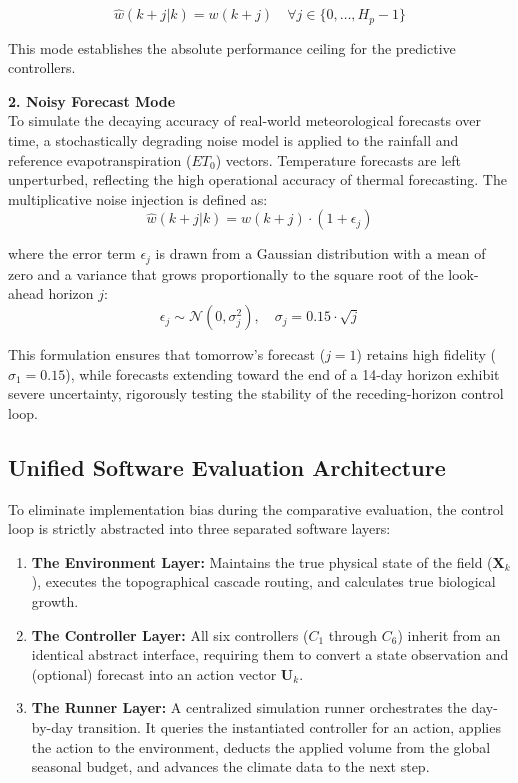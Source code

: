 \documentclass[11pt, a4paper]{article}
\begin{document}
\begin{equation}
    \hat{w}(k+j|k) = w(k+j) \quad \forall j \in \{0, \dots, H_p-1\}
\end{equation}

This mode establishes the absolute performance ceiling for the predictive controllers.

\textbf{2. Noisy Forecast Mode} \\
To simulate the decaying accuracy of real-world meteorological forecasts over time, a stochastically degrading noise model is applied to the rainfall and reference evapotranspiration ($ET_0$) vectors. Temperature forecasts are left unperturbed, reflecting the high operational accuracy of thermal forecasting. The multiplicative noise injection is defined as:
\begin{equation}
    \hat{w}(k+j|k) = w(k+j) \cdot (1 + \epsilon_j)
\end{equation}

where the error term $\epsilon_j$ is drawn from a Gaussian distribution with a mean of zero and a variance that grows proportionally to the square root of the look-ahead horizon $j$:
\begin{equation}
    \epsilon_j \sim \mathcal{N}(0, \sigma_j^2), \quad \sigma_j = 0.15 \cdot \sqrt{j}
\end{equation}

This formulation ensures that tomorrow's forecast ($j=1$) retains high fidelity ($\sigma_1 = 0.15$), while forecasts extending toward the end of a 14-day horizon exhibit severe uncertainty, rigorously testing the stability of the receding-horizon control loop.

\subsection{Unified Software Evaluation Architecture}
To eliminate implementation bias during the comparative evaluation, the control loop is strictly abstracted into three separated software layers:


\begin{enumerate}
    \item \textbf{The Environment Layer:} Maintains the true physical state of the field ($\mathbf{X}_k$), executes the topographical cascade routing, and calculates true biological growth.
    \item \textbf{The Controller Layer:} All six controllers ($C_1$ through $C_6$) inherit from an identical abstract interface, requiring them to convert a state observation and (optional) forecast into an action vector $\mathbf{U}_k$.
    \item \textbf{The Runner Layer:} A centralized simulation runner orchestrates the day-by-day transition. It queries the instantiated controller for an action, applies the action to the environment, deducts the applied volume from the global seasonal budget, and advances the climate data to the next step. 
\end{enumerate}
\end{document}
